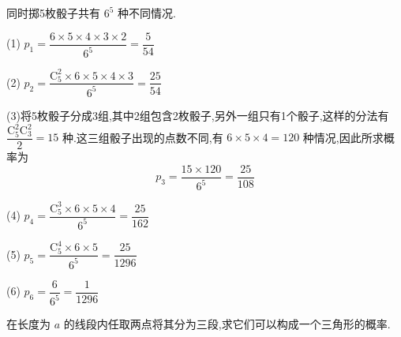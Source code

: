 \begin{solution}
    同时掷5枚骰子共有 $6^5$ 种不同情况.

    \vspace{0.3em}

    (1) $p_1 = \dfrac{6 \times 5 \times 4 \times 3 \times 2}{6^5} = \dfrac{5}{54}$

    \vspace{0.3em}

    (2) $p_2 = \dfrac{\mathrm{C}_5^2 \times 6 \times 5 \times 4 \times 3}{6^5} = \dfrac{25}{54}$

    \vspace{0.3em}

    (3)将5枚骰子分成3组,其中2组包含2枚骰子,另外一组只有1个骰子,这样的分法有 $\dfrac{\mathrm{C}_5^2 \mathrm{C}_3^2}{2} = 15$ 种.这三组骰子出现的点数不同,有 $6 \times 5 \times 4 = 120$ 种情况,因此所求概率为
    $$
    p_3 = \dfrac{15 \times 120}{6^5} = \dfrac{25}{108}
    $$

    (4) $p_4 = \dfrac{\mathrm{C}_5^3 \times 6 \times 5 \times 4}{6^5} = \dfrac{25}{162}$

    \vspace{0.3em}

    (5) $p_5 = \dfrac{\mathrm{C}_5^4 \times 6 \times 5}{6^5} = \dfrac{25}{1296}$

    (6) $p_6 = \dfrac{6}{6^5} = \dfrac{1}{1296}$
\end{solution}

\question 在长度为 $a$ 的线段内任取两点将其分为三段,求它们可以构成一个三角形的概率.

